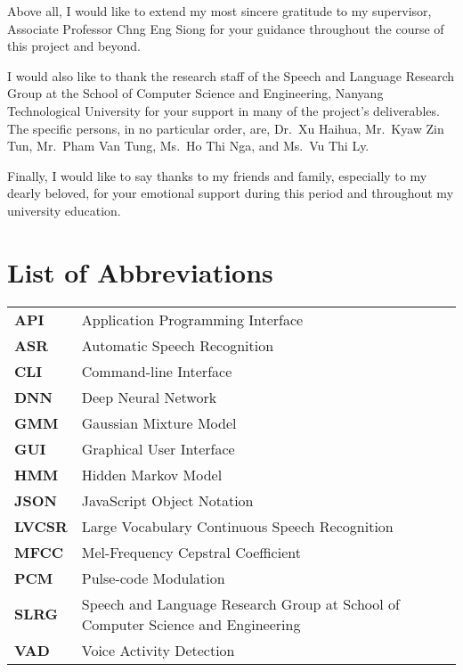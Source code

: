 Above all, I would like to extend my most sincere gratitude to my supervisor,
Associate Professor Chng Eng Siong for your guidance throughout
the course of this project and beyond.

I would also like to thank the research staff of the Speech
and Language Research Group at the School of Computer Science and Engineering,
Nanyang Technological University for your support in many of the project's
deliverables. The specific persons, in no particular order, are, Dr.\ Xu Haihua,
Mr.\ Kyaw Zin Tun, Mr.\ Pham Van Tung, Ms.\ Ho Thi Nga, and Ms.\ Vu Thi Ly.

Finally, I would like to say thanks to my friends and family, especially to my
dearly beloved, for your emotional support during this period and throughout my
university education.
\newpage

\tableofcontents
\newpage

\listoffigures
\newpage

\listoftables
\newpage

\chapter*{List of Abbreviations}
\begin{tabu}{lX}
    \textbf{API} & Application Programming Interface \\
    \textbf{ASR} & Automatic Speech Recognition \\
    \textbf{CLI} & Command-line Interface \\
    \textbf{DNN} & Deep Neural Network \\
    \textbf{GMM} & Gaussian Mixture Model \\
    \textbf{GUI} & Graphical User Interface \\
    \textbf{HMM} & Hidden Markov Model \\
    \textbf{JSON} & JavaScript Object Notation \\
    \textbf{LVCSR} & Large Vocabulary Continuous Speech Recognition \\
    \textbf{MFCC} & Mel-Frequency Cepstral Coefficient \\
    \textbf{PCM} & Pulse-code Modulation \\
    \textbf{SLRG} & Speech and Language Research Group at School of Computer
    Science and Engineering \\
    \textbf{VAD} & Voice Activity Detection
\end{tabu}
\newpage
